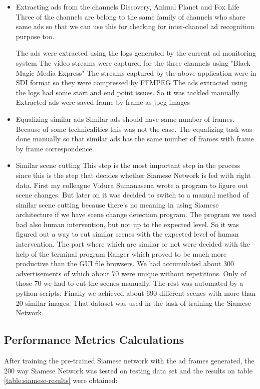 \begin{itemize}
\item Extracting ads from the channels Discovery, Animal Planet and Fox Life
\subitem Three of the channels are belong to the same family of channels who share same ads so that we can use this for checking for inter-channel ad recognition purpose too.

\subitem The ads were extracted using the logs generated by the current ad monitoring system
\subitem The video streams were captured for the three channels using "Black Magic Media Express"
\subitem The streams captured by the above application were in SDI format so they were compressed by FFMPEG
\subitem The ads extracted using the logs had some start and end point issues. So it was tackled manually.
\subitem Extracted ads were saved frame by frame as jpeg images

\item Equalizing similar ads
\subitem Similar ads should have same number of frames. Because of some technicalities this was not the case. The equalizing task was done manually so that similar ads has the same number of frames with frame by frame correspondence.

\item Similar scene cutting
\subitem This step is the most important step in the process since this is the step that decides whether Siamese Network is fed with right data. First my colleague Vidura Sumanasena wrote a program to figure out scene changes. But later on it was decided to switch to a manual method of similar scene cutting because there's no meaning in using Siamese architecture if we have scene change detection program. The program we used had also human intervention, but not up to the expected level.
\subitem So it was figured out a way to cut similar scenes with the expected level of human intervention. The part where which are similar or not were decided with the help of the terminal program Ranger which proved to be much more productive than the GUI file browsers.
\subitem We had accumulated about 300 advertisements of which about 70 were unique without repetitions. Only of those 70 we had to cut the scenes manually. The rest was automated by a python scripts.
\subitem Finally we achieved about 690 different scenes with more than 20 similar images.
\subitem That dataset was used in the task of training the Siamese Network.

\end{itemize}

\subsection{Performance Metrics Calculations}
After training the pre-trained Siamese network with the ad frames generated, the 200 way Siamese Network was tested on testing data set and the results on table \ref{table:siamese-results} were obtained:
 
